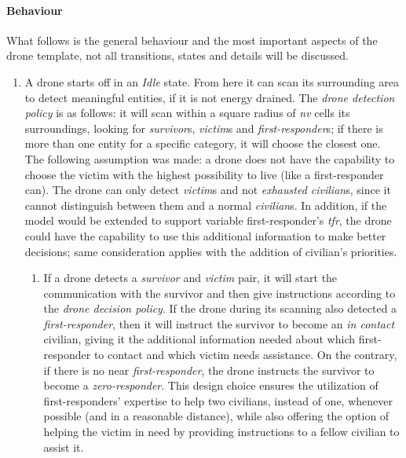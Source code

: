 \paragraph{Behaviour}
What follows is the general behaviour and the most important aspects of the drone template, not all transitions, states and details will be discussed.

\begin{enumerate}
	\item A drone starts off in an \textit{Idle} state. From here it can scan its surrounding area to detect meaningful entities, if it is not energy drained. The \textit{drone detection policy} is as follows: it will scan within a square radius of \textit{nv} cells its surroundings, looking for \textit{survivor}s, \textit{victim}s and \textit{first-responder}s; if there is more than one entity for a specific category, it will choose the closest one. The following assumption was made: a drone does not have the capability to choose the victim with the highest possibility to live (like a first-responder can). The drone can only detect \textit{victim}s and not \textit{exhausted civilian}s, since it cannot distinguish between them and a normal \textit{civilian}s. In addition, if the model would be extended to support variable first-responder's \textit{tfr}, the drone could have the capability to use this additional information to make better decisions; same consideration applies with the addition of civilian's priorities.
	\begin{enumerate}
		\item If a drone detects a \textit{survivor} and \textit{victim} pair, it will start the communication with the survivor and then give instructions according to the \textit{drone decision policy}. If the drone during its scanning also detected a \textit{first-responder}, then it will instruct the survivor to become an \textit{in contact} civilian, giving it the additional information needed about which first-responder to contact and which victim needs assistance. On the contrary, if there is no near \textit{first-responder}, the drone instructs the survivor to become a \textit{zero-responder}. This design choice ensures the utilization of first-responders' expertise to help two civilians, instead of one, whenever possible (and in a reasonable distance), while also offering the option of helping the victim in need by providing instructions to a fellow civilian to assist it.
		

\end{enumerate}
\end{enumerate}
